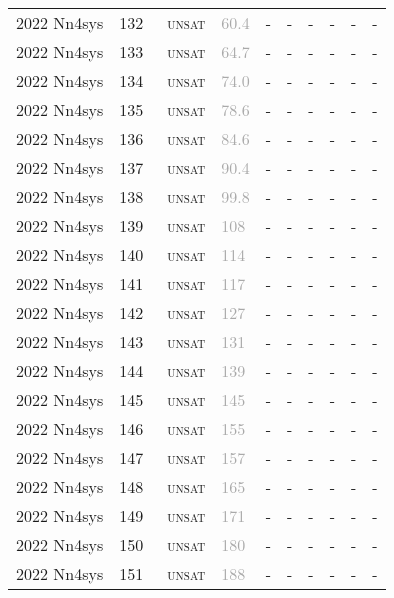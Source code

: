 \begin{center}
{\begin{longtable}{@{}llllllllll@{}}
2022 Nn4sys & 132 & ~\textsc{unsat} & \textcolor{darkgray}{60.4} & - & - & - & - & - & - \\
2022 Nn4sys & 133 & ~\textsc{unsat} & \textcolor{darkgray}{64.7} & - & - & - & - & - & - \\
2022 Nn4sys & 134 & ~\textsc{unsat} & \textcolor{darkgray}{74.0} & - & - & - & - & - & - \\
2022 Nn4sys & 135 & ~\textsc{unsat} & \textcolor{darkgray}{78.6} & - & - & - & - & - & - \\
2022 Nn4sys & 136 & ~\textsc{unsat} & \textcolor{darkgray}{84.6} & - & - & - & - & - & - \\
2022 Nn4sys & 137 & ~\textsc{unsat} & \textcolor{darkgray}{90.4} & - & - & - & - & - & - \\
2022 Nn4sys & 138 & ~\textsc{unsat} & \textcolor{darkgray}{99.8} & - & - & - & - & - & - \\
2022 Nn4sys & 139 & ~\textsc{unsat} & \textcolor{darkgray}{108} & - & - & - & - & - & - \\
2022 Nn4sys & 140 & ~\textsc{unsat} & \textcolor{darkgray}{114} & - & - & - & - & - & - \\
2022 Nn4sys & 141 & ~\textsc{unsat} & \textcolor{darkgray}{117} & - & - & - & - & - & - \\
2022 Nn4sys & 142 & ~\textsc{unsat} & \textcolor{darkgray}{127} & - & - & - & - & - & - \\
2022 Nn4sys & 143 & ~\textsc{unsat} & \textcolor{darkgray}{131} & - & - & - & - & - & - \\
2022 Nn4sys & 144 & ~\textsc{unsat} & \textcolor{darkgray}{139} & - & - & - & - & - & - \\
2022 Nn4sys & 145 & ~\textsc{unsat} & \textcolor{darkgray}{145} & - & - & - & - & - & - \\
2022 Nn4sys & 146 & ~\textsc{unsat} & \textcolor{darkgray}{155} & - & - & - & - & - & - \\
2022 Nn4sys & 147 & ~\textsc{unsat} & \textcolor{darkgray}{157} & - & - & - & - & - & - \\
2022 Nn4sys & 148 & ~\textsc{unsat} & \textcolor{darkgray}{165} & - & - & - & - & - & - \\
2022 Nn4sys & 149 & ~\textsc{unsat} & \textcolor{darkgray}{171} & - & - & - & - & - & - \\
2022 Nn4sys & 150 & ~\textsc{unsat} & \textcolor{darkgray}{180} & - & - & - & - & - & - \\
2022 Nn4sys & 151 & ~\textsc{unsat} & \textcolor{darkgray}{188} & - & - & - & - & - & - \\

\end{longtable}}
\end{center}
